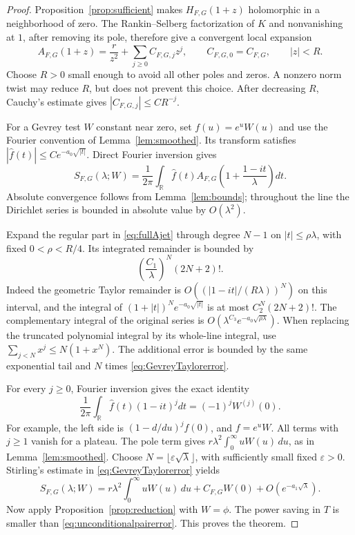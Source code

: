 \documentclass[11pt]{article}
\numberwithin{equation}{section}
\theoremstyle{remark}
\newcommand{\R}{\mathbb R}
\begin{document}
\begin{proof}
Proposition~\ref{prop:sufficient} makes $H_{F,G}(1+z)$ holomorphic in
a neighborhood of zero. The Rankin--Selberg factorization of $K$ and
nonvanishing at $1$, after removing its pole, therefore give a convergent
local expansion
\begin{equation}\label{eq:fullAjet}
 A_{F,G}(1+z)=\frac{r}{z^2}+\sum_{j\ge0}C_{F,G,j}z^j,
 \qquad C_{F,G,0}=C_{F,G},\qquad |z|<R.
\end{equation}
Choose $R>0$ small enough to avoid all other poles and zeros. A nonzero
norm twist may reduce $R$, but does not prevent this choice. After
decreasing $R$, Cauchy's estimate gives
$|C_{F,G,j}|\le C R^{-j}$.

For a Gevrey test $W$ constant near zero, set $f(u)=e^uW(u)$ and use
the Fourier convention of Lemma~\ref{lem:smoothed}. Its transform
satisfies $|\widehat f(t)|\le C e^{-a_0\sqrt{|t|}}$. Direct Fourier
inversion gives
\begin{equation}\label{eq:AlocalFourier}
 S_{F,G}(\lambda;W)=\frac1{2\pi}\int_\R\widehat f(t)
           A_{F,G}\!\left(1+\frac{1-it}{\lambda}\right)dt.
\end{equation}
Absolute convergence follows from Lemma~\ref{lem:bounds}; throughout
the line the Dirichlet series is bounded in absolute value by
$O(\lambda^2)$.

Expand the regular part in \eqref{eq:fullAjet} through degree $N-1$ on
$|t|\le\rho\lambda$, with fixed $0<\rho<R/4$. Its integrated remainder
is bounded by
\begin{equation}\label{eq:GevreyTaylorerror}
 \left(\frac{C_1}{\lambda}\right)^N(2N+2)!.
\end{equation}
Indeed the geometric Taylor remainder is
$O((|1-it|/(R\lambda))^N)$ on this interval, and the integral of
$(1+|t|)^N e^{-a_0\sqrt{|t|}}$ is at most $C_2^N(2N+2)!$.
The complementary integral of the original series is
$O(\lambda^{C_3}e^{-a_0\sqrt{\rho\lambda}})$.
When replacing the truncated polynomial integral by its whole-line
integral, use $\sum_{j<N}x^j\le N(1+x^N)$. The additional error is
bounded by the same exponential tail and $N$ times
\eqref{eq:GevreyTaylorerror}.

For every $j\ge0$, Fourier inversion gives the exact identity
\begin{equation}\label{eq:Taylorfunctional}
 \frac1{2\pi}\int_\R\widehat f(t)(1-it)^jdt
       =(-1)^jW^{(j)}(0).
\end{equation}
For example, the left side is $(1-d/du)^jf(0)$, and $f=e^uW$.
All terms with $j\ge1$ vanish for a plateau. The pole term gives
$r\lambda^2\int_0^\infty uW(u)\,du$, as in
Lemma~\ref{lem:smoothed}. Choose
$N=\lfloor\varepsilon\sqrt\lambda\rfloor$, with sufficiently small
fixed $\varepsilon>0$. Stirling's estimate in
\eqref{eq:GevreyTaylorerror} yields
\begin{equation}\label{eq:localGevreysum}
 S_{F,G}(\lambda;W)=r\lambda^2\int_0^\infty uW(u)\,du
          +C_{F,G}W(0)+O(e^{-a_1\sqrt\lambda}).
\end{equation}
Now apply Proposition~\ref{prop:reduction} with $W=\phi$.
The power saving in $T$ is smaller than
\eqref{eq:unconditionalpairerror}. This proves the theorem.
\end{proof}
\end{document}
